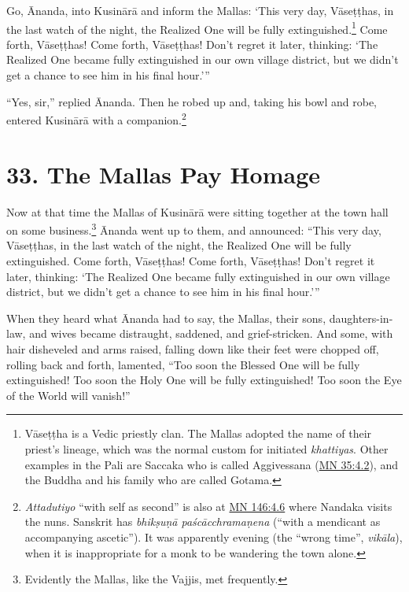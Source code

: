 \documentclass[12pt,openany]{book}%
\begin{document}
Go, Ānanda, into \textsanskrit{Kusinārā} and inform the Mallas: ‘This very day, \textsanskrit{Vāseṭṭhas}, in the last watch of the night, the Realized One will be fully extinguished.\footnote{\textsanskrit{Vāseṭṭha} is a Vedic priestly clan. The Mallas adopted the name of their priest’s lineage, which was the normal custom for initiated \textit{khattiyas}. Other examples in the Pali are Saccaka who is called Aggivessana (\href{https://suttacentral.net/mn35/en/sujato\#4.2}{MN 35:4.2}), and the Buddha and his family who are called Gotama. } Come forth, \textsanskrit{Vāseṭṭhas}! Come forth, \textsanskrit{Vāseṭṭhas}! Don’t regret it later, thinking: ‘The Realized One became fully extinguished in our own village district, but we didn’t get a chance to see him in his final hour.’” 

“Yes, sir,” replied Ānanda. Then he robed up and, taking his bowl and robe, entered \textsanskrit{Kusinārā} with a companion.\footnote{\textit{Attadutiyo} “with self as second” is also at \href{https://suttacentral.net/mn146/en/sujato\#4.6}{MN 146:4.6} where Nandaka visits the nuns. Sanskrit has \textit{\textsanskrit{bhikṣuṇā} \textsanskrit{paścācchramaṇena}} (“with a mendicant as accompanying ascetic”). It was apparently evening (the “wrong time”, \textit{\textsanskrit{vikāla}}), when it is inappropriate for a monk to be wandering the town alone. } 

\section*{33. The Mallas Pay Homage }

Now at that time the Mallas of \textsanskrit{Kusinārā} were sitting together at the town hall on some business.\footnote{Evidently the Mallas, like the Vajjis, met frequently. } Ānanda went up to them, and announced: “This very day, \textsanskrit{Vāseṭṭhas}, in the last watch of the night, the Realized One will be fully extinguished. Come forth, \textsanskrit{Vāseṭṭhas}! Come forth, \textsanskrit{Vāseṭṭhas}! Don’t regret it later, thinking: ‘The Realized One became fully extinguished in our own village district, but we didn’t get a chance to see him in his final hour.’” 

When they heard what Ānanda had to say, the Mallas, their sons, daughters-in-law, and wives became distraught, saddened, and grief-stricken. And some, with hair disheveled and arms raised, falling down like their feet were chopped off, rolling back and forth, lamented, “Too soon the Blessed One will be fully extinguished! Too soon the Holy One will be fully extinguished! Too soon the Eye of the World will vanish!” 
\end{document}
